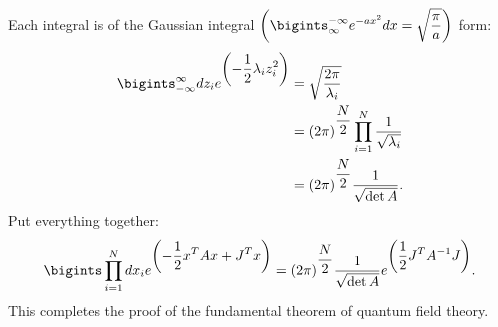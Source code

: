 Each integral is of the Gaussian integral $\displaystyle\left(\bigints_{\infty}^{-\infty}e^{-ax^2} dx = \sqrt{\frac{\pi}{a}}\right)$ form:
\begin{align}
    \bigints_{-\infty}^{\infty} dz_i e^{\displaystyle \left( -\frac{1}{2} \lambda_i z_i^2 \right)} &= \sqrt{\frac{2\pi}{\lambda_i}} \notag\\
    &= (2\pi)^{\displaystyle\frac{N}{2}} \prod_{i=1}^{N} \frac{1}{\sqrt{\lambda_i}} \notag\\
    &= (2\pi)^{\displaystyle\frac{N}{2}} \frac{1}{\sqrt{\det A}}.
\end{align}
Put everything together:
\begin{align}
    \bigints \prod_{i=1}^{N} dx_i e^{\displaystyle \left( -\frac{1}{2} x^T A x + J^T x \right)}
    = (2\pi)^{\displaystyle\frac{N}{2}} \frac{1}{\sqrt{\det A}} e^{\displaystyle \left( \frac{1}{2} J^T A^{-1} J \right)}.
\end{align}
This completes the proof of the fundamental theorem of quantum field theory.
\bigskip\bigskip\hline\hline\bigskip
